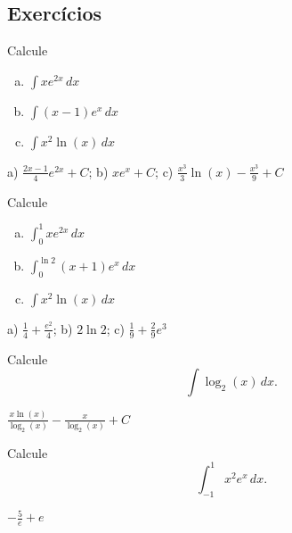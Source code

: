 \subsection{Exercícios}


\begin{exer}
  Calcule
  \begin{enumerate}[a)]
  \item $\displaystyle\int xe^{2x}\,dx$
  \item $\displaystyle\int (x-1)e^x\,dx$
  \item $\displaystyle\int x^2\ln(x)\,dx$
  \end{enumerate}
\end{exer}
\begin{resp}
  a) $\frac{2x-1}{4}e^{2x} + C$; b) $xe^x + C$; c) $\frac{x^3}{3}\ln(x) - \frac{x^3}{9} + C$
\end{resp}

\begin{exer}
  Calcule
  \begin{enumerate}[a)]
  \item $\displaystyle\int_0^1 xe^{2x}\,dx$
  \item $\displaystyle\int_0^{\ln 2} (x+1)e^x\,dx$
  \item $\displaystyle\int x^2\ln(x)\,dx$
  \end{enumerate}
\end{exer}
\begin{resp}
  a) $\frac{1}{4} + \frac{e^2}{4}$; b) $2\ln 2$; c) $\frac{1}{9} + \frac{2}{9}e^{3}$
\end{resp}

\begin{exer}
  Calcule
  \begin{equation}
    \int\log_2(x)\,dx.
  \end{equation}
\end{exer}
\begin{resp}
  $\displaystyle \frac{x\ln(x)}{\log_2(x)}-\frac{x}{\log_2(x)} + C$
\end{resp}

\begin{exer}
  Calcule
  \begin{equation}
    \int_{-1}^1 x^2e^x\,dx.
  \end{equation}
\end{exer}
\begin{resp}
  $-\frac{5}{e}+e$
\end{resp}

